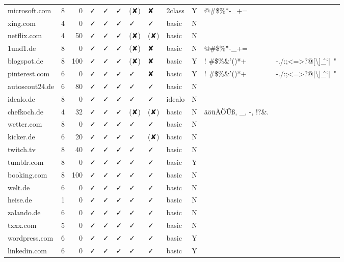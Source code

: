{\begin{longtable}{lrrlllllllp{1cm}p{1cm}}
		microsoft.com & 8     & 0     & ✓ & ✓ & ✓ & (✘) & ✘ & 2class & Y     & \multicolumn{1}{l}{@\#\$\%\^*-\_+=} &  \\
		xing.com & 4     & 0     & ✓ & ✓ & ✓ & ✓ & ✓ & basic & N     &       &  \\
		netflix.com & 4     & 50    & ✓ & ✓ & ✓ & (✘) & (✘) & basic & N     &       & \multicolumn{1}{l}{~} \\
		1und1.de & 8     & 0     & ✓ & ✓ & ✓ & (✘) & ✘ & basic & N     & \multicolumn{1}{l}{@\#\$\%\^*-\_+=} &  \\
		blogspot.de & 8     & 100   & ✓ & ✓ & ✓ & (✘) & ✘ & basic & Y     & \multicolumn{1}{l}{! \#\$\%\&'()*+} & \multicolumn{1}{l}{-./:;<=>?@[\textbackslash{}]\^\_`{|}~"} \\
		pinterest.com & 6     & 0     & ✓ & ✓ & ✓ & ✓ & ✘ & basic & Y     & \multicolumn{1}{l}{! \#\$\%\&'()*+} & \multicolumn{1}{l}{-./:;<=>?@[\textbackslash{}]\^\_`{|}~"} \\
		autoscout24.de & 6     & 80    & ✓ & ✓ & ✓ & ✓ & ✓ & basic & N     &       &  \\
		idealo.de & 8     & 0     & ✓ & ✓ & ✓ & ✓ & ✓ & idealo & N     &       &  \\
		chefkoch.de & 4     & 32    & ✓ & ✓ & ✓ & (✘) & (✘) & basic & N     & \multicolumn{1}{l}{äöüÄÖÜß, \_, -, !?\&.} &  \\
		wetter.com & 8     & 0     & ✓ & ✓ & ✓ & ✓ & ✓ & basic & N     &       &  \\
		kicker.de & 6     & 20    & ✓ & ✓ & ✓ & ✓ & (✘) & basic & N     &       &  \\
		twitch.tv & 8     & 40    & ✓ & ✓ & ✓ & ✓ & ✓ & basic & N     &       &  \\
		tumblr.com & 8     & 0     & ✓ & ✓ & ✓ & ✓ & ✓ & basic & Y     &       &  \\
		booking.com & 8     & 100   & ✓ & ✓ & ✓ & ✓ & ✓ & basic & N     &       &  \\
		welt.de & 6     & 0     & ✓ & ✓ & ✓ & ✓ & ✓ & basic & N     &       & \multicolumn{1}{l}{ } \\
		heise.de & 1     & 0     & ✓ & ✓ & ✓ & ✓ & ✓ & basic & N     &       &  \\
		zalando.de & 6     & 0     & ✓ & ✓ & ✓ & ✓ & ✓ & basic & N     &       &  \\
		txxx.com & 5     & 0     & ✓ & ✓ & ✓ & ✓ & ✓ & basic & N     &       &  \\
		wordpress.com & 6     & 0     & ✓ & ✓ & ✓ & ✓ & ✓ & basic & Y     &       &  \\
		linkedin.com & 6     & 0     & ✓ & ✓ & ✓ & ✓ & ✓ & basic & Y     &       &  \\

\end{longtable}}

